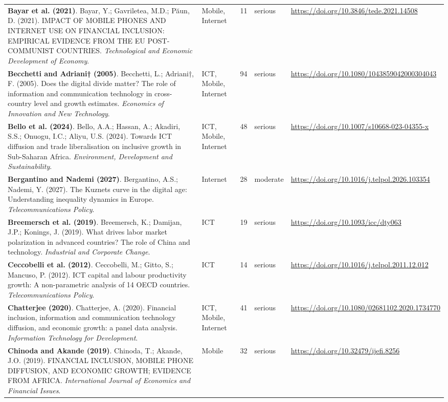 {\begin{longtable}{@{}p{7.4cm} p{1.3cm} r l p{3.4cm}@{}}
\textbf{Bayar et al. (2021)}. Bayar, Y.; Gavriletea, M.D.; Păun, D. (2021). IMPACT OF MOBILE PHONES AND INTERNET USE ON FINANCIAL INCLUSION: EMPIRICAL EVIDENCE FROM THE EU POST-COMMUNIST COUNTRIES. \emph{Technological and Economic Development of Economy}. & Mobile, Internet & 11 & serious & \url{https://doi.org/10.3846/tede.2021.14508} \\
\textbf{Becchetti and Adriani† (2005)}. Becchetti, L.; Adriani†, F. (2005). Does the digital divide matter? The role of information and communication technology in cross-country level and growth estimates. \emph{Economics of Innovation and New Technology}. & ICT, Mobile, Internet & 94 & serious & \url{https://doi.org/10.1080/1043859042000304043} \\
\textbf{Bello et al. (2024)}. Bello, A.A.; Hassan, A.; Akadiri, S.S.; Onuogu, I.C.; Aliyu, U.S. (2024). Towards ICT diffusion and trade liberalisation on inclusive growth in Sub-Saharan Africa. \emph{Environment, Development and Sustainability}. & ICT, Mobile, Internet & 48 & serious & \url{https://doi.org/10.1007/s10668-023-04355-x} \\
\textbf{Bergantino and Nademi (2027)}. Bergantino, A.S.; Nademi, Y. (2027). The Kuznets curve in the digital age: Understanding inequality dynamics in Europe. \emph{Telecommunications Policy}. & Internet & 28 & moderate & \url{https://doi.org/10.1016/j.telpol.2026.103354} \\
\textbf{Breemersch et al. (2019)}. Breemersch, K.; Damijan, J.P.; Konings, J. (2019). What drives labor market polarization in advanced countries? The role of China and technology. \emph{Industrial and Corporate Change}. & ICT & 19 & serious & \url{https://doi.org/10.1093/icc/dty063} \\
\textbf{Ceccobelli et al. (2012)}. Ceccobelli, M.; Gitto, S.; Mancuso, P. (2012). ICT capital and labour productivity growth: A non-parametric analysis of 14 OECD countries. \emph{Telecommunications Policy}. & ICT & 14 & serious & \url{https://doi.org/10.1016/j.telpol.2011.12.012} \\
\textbf{Chatterjee (2020)}. Chatterjee, A. (2020). Financial inclusion, information and communication technology diffusion, and economic growth: a panel data analysis. \emph{Information Technology for Development}. & ICT, Mobile, Internet & 41 & serious & \url{https://doi.org/10.1080/02681102.2020.1734770} \\
\textbf{Chinoda and Akande (2019)}. Chinoda, T.; Akande, J.O. (2019). FINANCIAL INCLUSION, MOBILE PHONE DIFFUSION, AND ECONOMIC GROWTH; EVIDENCE FROM AFRICA. \emph{International Journal of Economics and Financial Issues}. & Mobile & 32 & serious & \url{https://doi.org/10.32479/ijefi.8256} \\

\end{longtable}}
